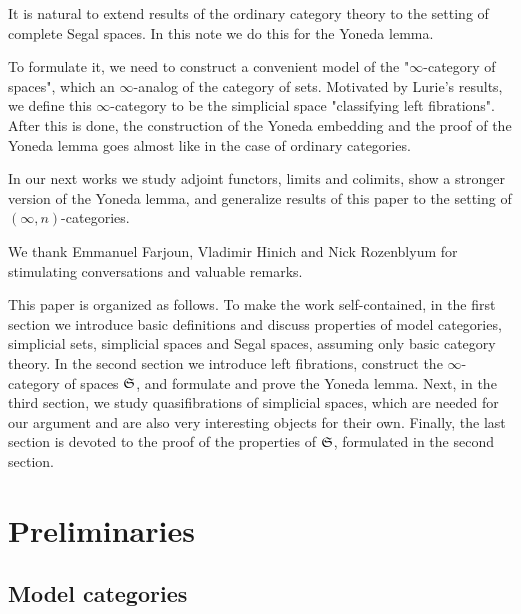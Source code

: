 \documentclass[12pt]{amsart}
\theoremstyle{plain}
\theoremstyle{definition}
\numberwithin{equation}{section}
\renewcommand{\S}{\frak{S}}
\begin{document}
It is natural to extend results of the ordinary category
theory to the setting of complete Segal spaces. In this note we do
this for the Yoneda lemma.

To formulate it, we need to construct a convenient model of the
"$\infty$-category of spaces", which an $\infty$-analog of the
category of sets. Motivated by Lurie's results,  
we define this $\infty$-category to be the simplicial space "classifying left
fibrations". After this is done, the construction of the Yoneda embedding and 
the proof of the Yoneda lemma goes almost like in the case of ordinary categories. 

In our next works \cite{KV1,KV2} we study adjoint functors, limits and
colimits, show a stronger version of the Yoneda lemma, and generalize results of this paper 
to the setting of $(\infty,n)$-categories.

We thank Emmanuel Farjoun, Vladimir Hinich and Nick Rozenblyum for
stimulating conversations and valuable remarks.

This paper is organized as follows. To make the work self-contained,
in the first section we introduce basic definitions and discuss
properties of model categories, simplicial sets, simplicial spaces
and Segal spaces, assuming only basic category theory. In the
second section we introduce left fibrations, construct the
$\infty$-category of spaces $\S$, and formulate and prove the
Yoneda lemma. Next, in the third section, we study quasifibrations
of simplicial spaces, which are needed for our argument and are also
very interesting objects for their own. Finally, the last section
is devoted to the proof of the properties of $\S$, formulated in
the second section. 

\section{Preliminaries}

\subsection{Model categories}
\end{document}
